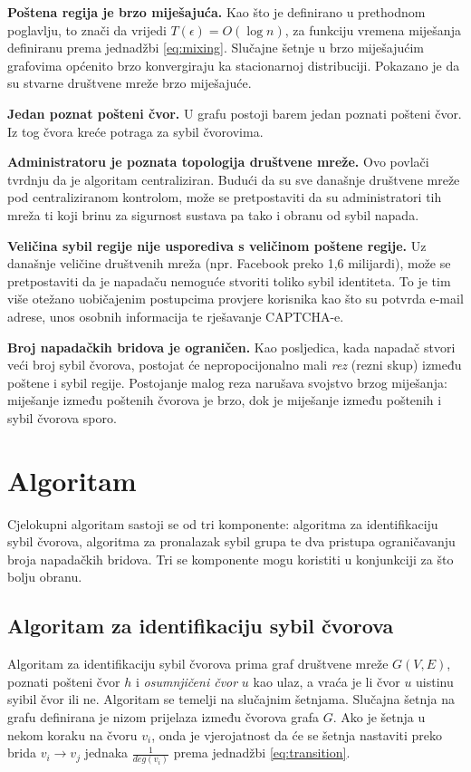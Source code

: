 \documentclass[times, utf8, seminar, numeric]{fer}
\begin{document}
\textbf{Poštena regija je brzo miješajuća.} Kao što je definirano u prethodnom poglavlju, to znači da vrijedi $T(\epsilon) = O(\log n)$, za funkciju vremena miješanja definiranu prema jednadžbi \ref{eq:mixing}. Slučajne šetnje u brzo miješajućim grafovima općenito brzo konvergiraju ka stacionarnoj distribuciji. \cite{sybil-defender} Pokazano je da su stvarne društvene mreže brzo miješajuće. \cite{sybil-limit}

\textbf{Jedan poznat pošteni čvor.} U grafu postoji barem jedan poznati pošteni čvor. Iz tog čvora kreće potraga za sybil čvorovima.

\textbf{Administratoru je poznata topologija društvene mreže.} Ovo povlači tvrdnju da je algoritam centraliziran. Budući da su sve današnje društvene mreže pod centraliziranom kontrolom, može se pretpostaviti da su administratori tih mreža ti koji brinu za sigurnost sustava pa tako i obranu od sybil napada.

\textbf{Veličina sybil regije nije usporediva s veličinom poštene regije.} Uz današnje veličine društvenih mreža (npr. Facebook preko 1,6 milijardi), može se pretpostaviti da je napadaču nemoguće stvoriti toliko sybil identiteta. To je tim više otežano uobičajenim postupcima provjere korisnika kao što su potvrda e-mail adrese, unos osobnih informacija te rješavanje CAPTCHA-e.

\textbf{Broj napadačkih bridova je ograničen.} Kao posljedica, kada napadač stvori veći broj sybil čvorova, postojat će nepropocijonalno mali \textit{rez} (rezni skup) između poštene i sybil regije. Postojanje malog reza narušava svojstvo brzog miješanja: miješanje između poštenih čvorova je brzo, dok je miješanje između poštenih i sybil čvorova sporo.

\section{Algoritam}
Cjelokupni algoritam sastoji se od tri komponente: algoritma za identifikaciju sybil čvorova, algoritma za pronalazak sybil grupa te dva pristupa ograničavanju broja napadačkih bridova. Tri se komponente mogu koristiti u konjunkciji za što bolju obranu. \cite{sybil-defender}

\subsection{Algoritam za identifikaciju sybil čvorova}
Algoritam za identifikaciju sybil čvorova prima graf društvene mreže $G(V, E)$, poznati pošteni čvor $h$ i \textit{osumnjičeni čvor}  $u$ kao ulaz, a vraća je li čvor $u$ uistinu syibil čvor ili ne. Algoritam se temelji na slučajnim šetnjama. Slučajna šetnja na grafu definirana je nizom prijelaza između čvorova grafa $G$. Ako je šetnja u nekom koraku na čvoru $v_i$, onda je vjerojatnost da će se šetnja nastaviti preko brida $v_i \to v_j$ jednaka $\frac{1}{deg(v_i)}$ prema jednadžbi \ref{eq:transition}.
\end{document}
